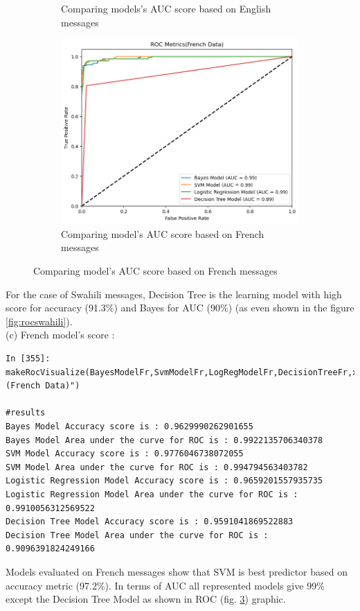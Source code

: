 \documentclass[12pt,a4paper, oneside]{book}
\begin{document}
\begin{figure}[h]
\begin{subfigure}{7.5cm}
	\caption{Comparing models's AUC score based on English messages}
	\label{fig:rocenglish}
\end{subfigure} 
\begin{subfigure}{7.5cm}
	\centering
	\includegraphics[width=1\linewidth]{CollectImages/rocFrench}
	\caption{Comparing model's AUC score based on French messages}
	\label{fig:rocfrench}
\end{subfigure} 
\end{figure}

For the case of Swahili messages, Decision Tree is the learning model with high score for accuracy (91.3\%) and Bayes for AUC (90\%)  (as even shown in the figure \ref{fig:rocswahili}).
\\

(c) French model's score :

 \begin{lstlisting}[style=stylejupyter]
In [355]: makeRocVisualize(BayesModelFr,SvmModelFr,LogRegModelFr,DecisionTreeFr,x_test_features_fr,y_test_fr,"(French Data)")

#results 
Bayes Model Accuracy score is : 0.9629990262901655
Bayes Model Area under the curve for ROC is : 0.9922135706340378
SVM Model Accuracy score is : 0.9776046738072055
SVM Model Area under the curve for ROC is : 0.994794563403782
Logistic Regression Model Accuracy score is : 0.9659201557935735
Logistic Regression Model Area under the curve for ROC is : 0.9910056312569522
Decision Tree Model Accuracy score is : 0.9591041869522883
Decision Tree Model Area under the curve for ROC is : 0.9096391824249166
\end{lstlisting}  
Models evaluated on French messages show that SVM is best predictor based on accuracy metric (97.2\%). In terms of AUC all represented models give 99\% except the Decision Tree Model as shown in ROC (fig. \ref{fig:rocfrench}) graphic. 
\\
\end{document}
